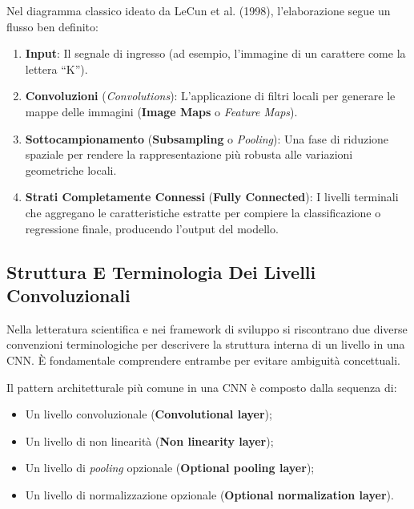 ﻿\documentclass[11pt, a4paper]{article}
\begin{document}

Nel diagramma classico ideato da LeCun et al. (1998), l'elaborazione segue un flusso ben definito:
\begin{enumerate}
    \item \textbf{Input}: Il segnale di ingresso (ad esempio, l'immagine di un carattere come la lettera ``K'').
    \item \textbf{Convoluzioni} (\emph{Convolutions}): L'applicazione di filtri locali per generare le mappe delle immagini (\textbf{Image Maps} o \emph{Feature Maps}).
    \item \textbf{Sottocampionamento} (\textbf{Subsampling} o \emph{Pooling}): Una fase di riduzione spaziale per rendere la rappresentazione più robusta alle variazioni geometriche locali.
    \item \textbf{Strati Completamente Connessi} (\textbf{Fully Connected}): I livelli terminali che aggregano le caratteristiche estratte per compiere la classificazione o regressione finale, producendo l'output del modello.
\end{enumerate}

\subsection{Struttura E Terminologia Dei Livelli Convoluzionali}

Nella letteratura scientifica e nei framework di sviluppo si riscontrano due diverse convenzioni terminologiche per descrivere la struttura interna di un livello in una CNN. È fondamentale comprendere entrambe per evitare ambiguità concettuali.


Il pattern architetturale più comune in una CNN è composto dalla sequenza di:
\begin{itemize}
    \item Un livello convoluzionale (\textbf{Convolutional layer});
    \item Un livello di non linearità (\textbf{Non linearity layer});
    \item Un livello di \emph{pooling} opzionale (\textbf{Optional pooling layer});
    \item Un livello di normalizzazione opzionale (\textbf{Optional normalization layer}).
\end{itemize}
\end{document}
